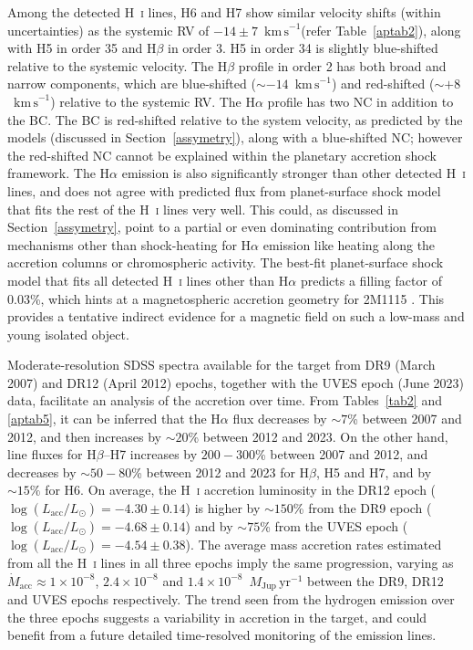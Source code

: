 \documentclass{aa}
\newcommand{\mjyr}{\ensuremath{M_\mathrm{Jup}\,\mathrm{yr^{-1}}}\xspace}
\newcommand{\lsun}{\ensuremath{L_\odot}\xspace}
\newcommand{\Ha}{\ensuremath{\mathrm{H}\alpha}\xspace}
\newcommand{\Hb}{\ensuremath{\mathrm{H}\beta}\xspace}
\newcommand{\Lacc}{\ensuremath{L_{\mathrm{acc}}}\xspace}
\newcommand{\mdot}{\ensuremath{\dot{M}_{\mathrm{acc}}}\xspace}
\newcommand{\Hi}{H~\textsc{i}\xspace}
\newcommand{\kms}{\ensuremath{\mathrm{km\,s}^{-1}}\xspace}
\begin{document}
Among the detected \Hi lines, H6 and H7 show similar velocity shifts (within uncertainties) as the systemic RV of $-14\pm7$~\kms (refer Table~\ref{aptab2}), along with H5 in order 35 and \Hb in order 3. H5 in order 34 is slightly blue-shifted relative to the systemic velocity. The \Hb profile in order 2 has both broad and narrow components, which are blue-shifted ($\sim-14$~\kms) and red-shifted ($\sim+8$~\kms) relative to the systemic RV. The \Ha profile has two NC in addition to the BC. The BC is red-shifted relative to the system velocity, as predicted by the \cite{aoyama2018, aoyama2021} models (discussed in Section~\ref{assymetry}), along with a blue-shifted NC; however the red-shifted NC cannot be explained within the planetary accretion shock framework. The \Ha emission is also significantly stronger than other detected \Hi lines, and does not agree with predicted flux from planet-surface shock model that fits the rest of the \Hi lines very well. This could, as discussed in Section~\ref{assymetry}, point to a partial or even dominating contribution from mechanisms other than shock-heating for \Ha emission like heating along the accretion columns or chromospheric activity. The best-fit planet-surface shock model that fits all detected \Hi lines other than \Ha predicts a filling factor of 0.03\%, which hints at a magnetospheric accretion geometry for 2M1115 \citep{ringqvist2023}. This provides a tentative indirect evidence for a magnetic field on such a low-mass and young isolated object.

Moderate-resolution SDSS spectra available for the target from DR9 (March 2007) and DR12 (April 2012) epochs, together with the UVES epoch (June 2023) data, facilitate an analysis of the accretion over time. From Tables~\ref{tab2} and \ref{aptab5}, it can be inferred that the H$\alpha$ flux decreases by $\sim7$\% between 2007 and 2012, and then increases by $\sim20$\% between 2012 and 2023. On the other hand, line fluxes for \Hb--H7 increases by $200-300$\% between 2007 and 2012, and decreases by $\sim50-80$\% between 2012 and 2023 for \Hb, H5 and H7, and by $\sim15\%$ for H6. 
On average, the \Hi accretion luminosity in the DR12 epoch ($\log(\Lacc/\lsun)=-4.30\pm0.14$) is higher by $\sim150$\% from the DR9 epoch ($\log(\Lacc/\lsun)=-4.68\pm0.14$) and by $\sim75$\% from the UVES epoch ($\log(\Lacc/\lsun)=-4.54\pm0.38$). The average mass accretion rates estimated from all the \Hi lines in all three epochs imply the same progression, varying as \mdot$\approx1\times10^{-8}$, $2.4\times10^{-8}$ and $1.4\times10^{-8}$~\mjyr between the DR9, DR12 and UVES epochs respectively. The trend seen from the hydrogen emission over the three epochs suggests a variability in accretion in the target, and could benefit from a future detailed time-resolved monitoring of the emission lines.
\end{document}
